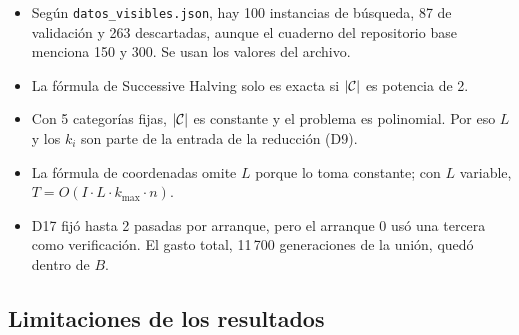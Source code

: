 \begin{itemize}
  \item Según \texttt{datos\_visibles.json}, hay 100 instancias de búsqueda, 87 de validación
    y 263 descartadas, aunque el cuaderno del repositorio base menciona 150 y 300. Se usan
    los valores del archivo.
  \item La fórmula de Successive Halving solo es exacta si $|\mathcal{C}|$ es potencia de 2.
  \item Con 5 categorías fijas, $|\mathcal{C}|$ es constante y el problema es polinomial. Por eso
    $L$ y los $k_i$ son parte de la entrada de la reducción (D9).
  \item La fórmula de coordenadas omite $L$ porque lo toma constante; con $L$ variable,
    $T=O(I\cdot L\cdot k_{\max}\cdot n)$.
  \item D17 fijó hasta 2 pasadas por arranque, pero el arranque 0 usó una tercera como
    verificación. El gasto total, 11\,700 generaciones de la unión, quedó dentro de $B$.
\end{itemize}

\subsection{Limitaciones de los resultados}


